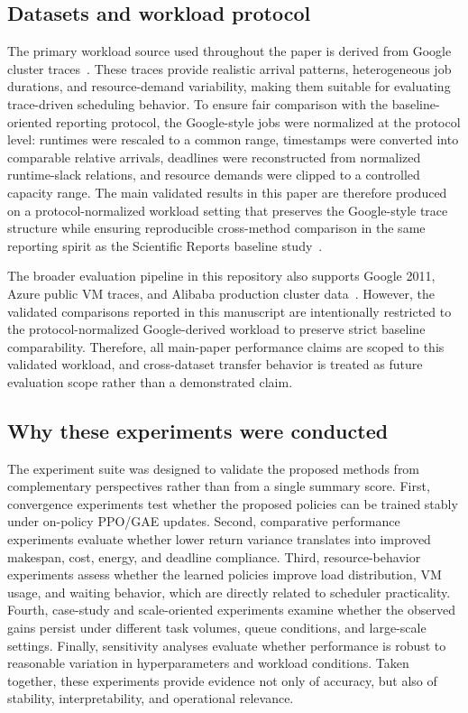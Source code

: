 \documentclass[journal]{IEEEtran}
\begin{document}
\subsection{Datasets and workload protocol}
The primary workload source used throughout the paper is derived from Google cluster traces~\cite{reiss2011googlecluster}. These traces provide realistic arrival patterns, heterogeneous job durations, and resource-demand variability, making them suitable for evaluating trace-driven scheduling behavior. To ensure fair comparison with the baseline-oriented reporting protocol, the Google-style jobs were normalized at the protocol level: runtimes were rescaled to a common range, timestamps were converted into comparable relative arrivals, deadlines were reconstructed from normalized runtime-slack relations, and resource demands were clipped to a controlled capacity range. The main validated results in this paper are therefore produced on a protocol-normalized workload setting that preserves the Google-style trace structure while ensuring reproducible cross-method comparison in the same reporting spirit as the Scientific Reports baseline study~\cite{zhang2025s41598}.

The broader evaluation pipeline in this repository also supports Google 2011, Azure public VM traces, and Alibaba production cluster data~\cite{reiss2011googlecluster, azurepublicdataset, alibabacluster2018}. However, the validated comparisons reported in this manuscript are intentionally restricted to the protocol-normalized Google-derived workload to preserve strict baseline comparability. Therefore, all main-paper performance claims are scoped to this validated workload, and cross-dataset transfer behavior is treated as future evaluation scope rather than a demonstrated claim.

\subsection{Why these experiments were conducted}
The experiment suite was designed to validate the proposed methods from complementary perspectives rather than from a single summary score. First, convergence experiments test whether the proposed policies can be trained stably under on-policy PPO/GAE updates. Second, comparative performance experiments evaluate whether lower return variance translates into improved makespan, cost, energy, and deadline compliance. Third, resource-behavior experiments assess whether the learned policies improve load distribution, VM usage, and waiting behavior, which are directly related to scheduler practicality. Fourth, case-study and scale-oriented experiments examine whether the observed gains persist under different task volumes, queue conditions, and large-scale settings. Finally, sensitivity analyses evaluate whether performance is robust to reasonable variation in hyperparameters and workload conditions. Taken together, these experiments provide evidence not only of accuracy, but also of stability, interpretability, and operational relevance.
\end{document}
